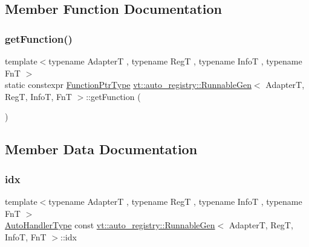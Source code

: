 \subsection{Member Function Documentation}
\mbox{\label{structvt_1_1auto__registry_1_1_runnable_gen_a96a55abd9ec0504cb8c567b1e95807d0}} 
\subsubsection{\texorpdfstring{get\+Function()}{getFunction()}}
{\footnotesize\ttfamily template$<$typename AdapterT , typename RegT , typename InfoT , typename FnT $>$ \\
static constexpr \hyperlink{structvt_1_1auto__registry_1_1_runnable_gen_a5e4295a0af4d2d89a37687c63afb0591}{Function\+Ptr\+Type} \hyperlink{structvt_1_1auto__registry_1_1_runnable_gen}{vt\+::auto\+\_\+registry\+::\+Runnable\+Gen}$<$ AdapterT, RegT, InfoT, FnT $>$\+::get\+Function (\begin{DoxyParamCaption}{ }\end{DoxyParamCaption})\hspace{0.3cm}{\ttfamily [static]}}



\subsection{Member Data Documentation}
\mbox{\label{structvt_1_1auto__registry_1_1_runnable_gen_a7feb1522810ba800d935ee58d970720d}} 
\subsubsection{\texorpdfstring{idx}{idx}}
{\footnotesize\ttfamily template$<$typename AdapterT , typename RegT , typename InfoT , typename FnT $>$ \\
\hyperlink{namespacevt_1_1auto__registry_ae295e18699146815bb7d7674594d95d7}{Auto\+Handler\+Type} const \hyperlink{structvt_1_1auto__registry_1_1_runnable_gen}{vt\+::auto\+\_\+registry\+::\+Runnable\+Gen}$<$ AdapterT, RegT, InfoT, FnT $>$\+::idx\hspace{0.3cm}{\ttfamily [static]}}

